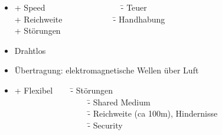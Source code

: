 \begin{itemize}
	\item[] \begin{tabbing}
		+ Speed ~~~~~~~~~~~~~~~~~ \= - Teuer \\
		+ Reichweite ~~~~~~~~~~~ \= - Handhabung \\
		+ Störungen
	\end{tabbing}
	\item Drahtlos
	\item[] Übertragung: elektromagnetische Wellen über Luft
	\item[] \begin{tabbing}
		+ Flexibel ~~~ \= - Störungen \\
		~~~~~~~~~~~~~~~~~ \= - Shared Medium \\
		~~~~~~~~~~~~~~~~~ \= - Reichweite (ca 100m), Hindernisse \\
		~~~~~~~~~~~~~~~~~ \= - Security \\
	\end{tabbing}
\end{itemize}